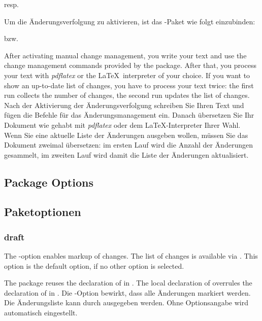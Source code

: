
	resp.

\fi
	\ifGERMAN
		Um die Änderungsverfolgung zu aktivieren, ist das -Paket wie folgt einzubinden:


		bzw.

	\fi

\ifENGLISH
	After activating manual change management, you write your text and use the change management commands provided by the package.
	After that, you process your text with \emph{pdflatex} or the \LaTeX\ interpreter of your choice.
	If you want to show an up-to-date list of changes, you have to process your text twice: the first run collects the number of changes, the second run updates the list of changes.
\fi
	\ifGERMAN
		Nach der Aktivierung der Änderungsverfolgung schreiben Sie Ihren Text und fügen die Befehle für das Änderungsmanagement ein.
		Danach übersetzen Sie Ihr Dokument wie gehabt mit \emph{pdflatex} oder dem \LaTeX-Interpreter Ihrer Wahl.
		Wenn Sie eine aktuelle Liste der Änderungen ausgeben wollen, müssen Sie das Dokument zweimal übersetzen: im ersten Lauf wird die Anzahl der Änderungen gesammelt, im zweiten Lauf wird damit die Liste der Änderungen aktualisiert.
	\fi

\ifENGLISH
	\subsection{Package Options}
\fi
	\ifGERMAN
		\subsection{Paketoptionen}
	\fi
\label{sec:user:options}

\subsubsection{draft}
\ifENGLISH
	The -option enables markup of changes.
	The list of changes is available via .
	This option is the default option, if no other option is selected.

	The  package reuses the declaration of  in .
	The local declaration of  overrules the declaration of  in .
\fi
	\ifGERMAN
		Die -Option bewirkt, dass alle Änderungen markiert werden.
		Die Änderungsliste kann durch  ausgegeben werden.
		Ohne Optionsangabe wird  automatisch eingestellt.


